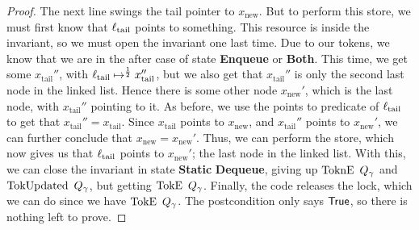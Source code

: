 \documentclass[a4paper, 10pt]{report}
\theoremstyle{definition}
\newcommand{\locN}[1]{\loc_{\mathrm{#1}}}
\newcommand{\loctail}{\locN{tail}}
\newcommand{\node}{x}
\newcommand{\nodeN}[1]{\node_{\mathrm{#1}}}
\newcommand{\nodetail}{\nodeN{tail}}
\newcommand{\nodenew}{\nodeN{new}}
\newcommand{\StaticState}{\textbf{Static}}
\newcommand{\EnqueueState}{\textbf{Enqueue}}
\newcommand{\DequeueState}{\textbf{Dequeue}}
\newcommand{\BothState}{\textbf{Both}}
\newcommand{\Qg}{Q_\gname}
\newcommand{\TokE}[1]{\operatorname{TokE} ~ #1}
\newcommand{\TokEQg}{\TokE{\Qg}}
\newcommand{\ToknE}[1]{\operatorname{ToknE} ~ #1}
\newcommand{\ToknEQg}{\ToknE{\Qg}}
\newcommand{\TokUpdated}[1]{\operatorname{TokUpdated} ~ #1}
\newcommand{\TokUpdatedQg}{\TokUpdated{\Qg}}
\begin{document}
\begin{proof}
The next line swings the tail pointer to $\nodenew$. But to perform this store, we must first know that $\loctail$ points to something. This resource is inside the invariant, so we must open the invariant one last time. Due to our tokens, we know that we are in the after case of state \EnqueueState{} or \BothState{}. This time, we get some $\nodetail''$, with $\loctail \mapsto^{\frac{1}{2}} \nodetail''$, but we also get that $\nodetail''$ is only the second last node in the linked list. Hence there is some other node $\nodenew'$, which is the last node, with $\nodetail''$ pointing to it. As before, we use the points to predicate of $\loctail$ to get that $\nodetail'' = \nodetail$. Since $\nodetail$ points to $\nodenew$, and $\nodetail''$ points to $\nodenew'$, we can further conclude that $\nodenew = \nodenew'$. Thus, we can perform the store, which now gives us that $\loctail$ points to $\nodenew'$; the last node in the linked list. With this, we can close the invariant in state \StaticState{} \DequeueState{}, giving up $\ToknEQg$ and $\TokUpdatedQg$, but getting $\TokEQg$. Finally, the code releases the lock, which we can do since we have $\TokEQg$. The postcondition only says $\textsf{True}$, so there is nothing left to prove.
\end{proof}
\end{document}
